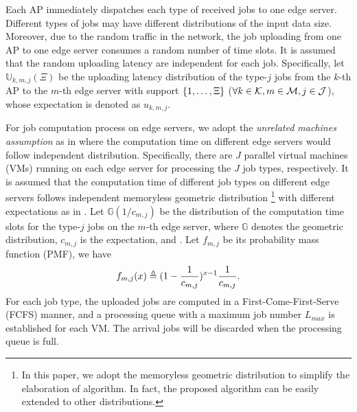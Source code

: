 Each AP immediately dispatches each type of received jobs to one edge server.
Different types of jobs may have different distributions of the input data size.
Moreover, due to the random traffic in the network, the job uploading from one AP to one edge server consumes a random number of time slots.
It is assumed that the random uploading latency are independent for each job.
Specifically, let $\mathbb{U}_{k,m,j}(\Xi)$ be the uploading latency distribution of the type-$j$ jobs from the $k$-th AP to the $m$-th edge server with support $\{1, \dots, \Xi\}$ ($\forall k\in\mathcal{K}, m\in\mathcal{M}, j\in\mathcal{J}$), whose expectation is denoted as $u_{k,m,j}$.

For job computation process on edge servers, we adopt the \emph{unrelated machines assumption} as in \cite{tan-online} where the computation time on different edge servers would follow independent distribution.
Specifically, there are $J$ parallel virtual machines (VMs) running on each edge server for processing the $J$ job types, respectively.
It is assumed that the computation time of different job types on different edge servers follows independent memoryless geometric distribution 
\footnote{In this paper, we adopt the memoryless geometric distribution to simplify the elaboration of algorithm. In fact, the proposed algorithm can be easily extended to other distributions.}
with different expectations as in \cite{TOWC18-HuangKb}.
Let $\mathbb{G}(1/c_{m,j})$ be the distribution of the computation time slots for the type-$j$ jobs on the $m$-th edge server, where $\mathbb{G}$ denotes the geometric distribution, $c_{m,j}$ is the expectation, and .
Let $f_{m,j}$ be its probability mass function (PMF), we have
\begin{align}
    f_{m,j}(x) \triangleq (1-\frac{1}{c_{m,j}})^{x-1} \frac{1}{c_{m,j}}.
\end{align}
For each job type, the uploaded jobs are computed in a First-Come-First-Serve (FCFS) manner, and a processing queue with a maximum job number $L_{max}$ is established for each VM.
The arrival jobs will be discarded when the processing queue is full.

